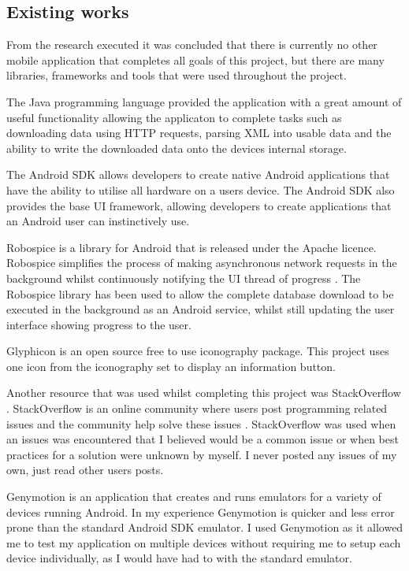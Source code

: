 \subsection{Existing works}

From the research executed it was concluded that there is currently no other mobile application that completes all goals of this project, but there are many libraries, frameworks and tools that were used throughout the project.

The Java \cite{java} programming language provided the application with a great amount of useful functionality allowing the applicaton to complete tasks such as downloading data using HTTP requests, parsing XML \cite{xml} into usable data and the ability to write the downloaded data onto the devices internal storage.

The Android SDK \cite{android_sdk} allows developers to create native Android applications that have the ability to utilise all hardware on a users device. The Android SDK \cite{android_sdk} also provides the base UI framework, allowing developers to create applications that an Android user can instinctively use. 

Robospice \cite{robospice} is a library for Android that is released under the Apache licence. Robospice simplifies the process of making asynchronous network requests in the background whilst continuously notifying the UI thread of progress \cite{robospice} . The Robospice \cite{robospice} library has been used to allow the complete database download to be executed in the background as an Android service, whilst still updating the user interface showing progress to the user. 

Glyphicon \cite{glyph} is an open source free to use iconography package. This project uses one icon from the iconography set to display an information button.

Another resource that was used whilst completing this project was StackOverflow \cite{stackoverflow}. StackOverflow is an online community where users post programming related issues and the community help solve these issues \cite{stackoverflow}. StackOverflow was used when an issues was encountered that I believed would be a common issue or when best practices for a solution were unknown by myself. I never posted any issues of my own, just read other users posts.  

Genymotion \cite{genymotion} is an application that creates and runs emulators for a variety of devices running Android. In my experience Genymotion is quicker and less error prone than the standard Android SDK \cite{android_sdk} emulator. I used Genymotion as it allowed me to test my application on multiple devices without requiring me to setup each device individually, as I would have had to with the standard emulator.

